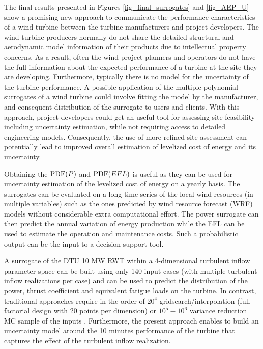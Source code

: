 \documentclass[preprint,12pt]{elsarticle}
\begin{document}
The final results presented in Figures \ref{fig_final_surrogates} and \ref{fig_AEP_U} show a promising new approach to communicate the performance characteristics of a wind turbine between the turbine manufacturers and project developers. The wind turbine producers normally do not share the detailed structural and aerodynamic model information of their products due to intellectual property concerns. As a result, often the wind project planners and operators do not have the full information about the expected performance of a turbine at the site they are developing. Furthermore, typically there is no model for the uncertainty of the turbine performance. A possible application of the multiple polynomial surrogates of a wind turbine could involve fitting the model by the manufacturer, and consequent distribution of the surrogate to users and clients. With this approach, project developers could get an useful tool for assessing site feasibility including uncertainty estimation, while not requiring access to detailed engineering models. Consequently, the use of more refined site assessment can potentially lead to improved overall estimation of levelized cost of energy and its uncertainty.

Obtaining the $\mathrm{PDF}(P)$ and $\mathrm{PDF}(EFL)$ is useful as they can be used for uncertainty estimation of the levelized cost of energy on a yearly basis. The surrogates can be evaluated on a long time series of the local wind resources (in multiple variables) such as the ones predicted by wind resource forecast (WRF) models without considerable extra computational effort. The power surrogate can then predict the annual variation of energy production while the EFL can be used to estimate the operation and maintenance costs. Such a probabilistic output can be the input to a decision support tool.

A surrogate of the DTU 10 MW RWT within a 4-dimensional turbulent inflow parameter space can be built using only 140 input cases (with multiple turbulent inflow realizations per case) and can be used to predict the distribution of the power, thrust coefficient and equivalent fatigue loads on the turbine. In contrast, traditional approaches require in the order of $20^4$ gridsearch/interpolation (full factorial design with  20 points per dimension) or $10^5-10^6$ variance reduction MC sample of the inputs \cite{dimitrov2015model}. Furthermore, the present approach enables to build an uncertainty model around the 10 minutes performance of the turbine that captures the effect of the turbulent inflow realization.
\end{document}
